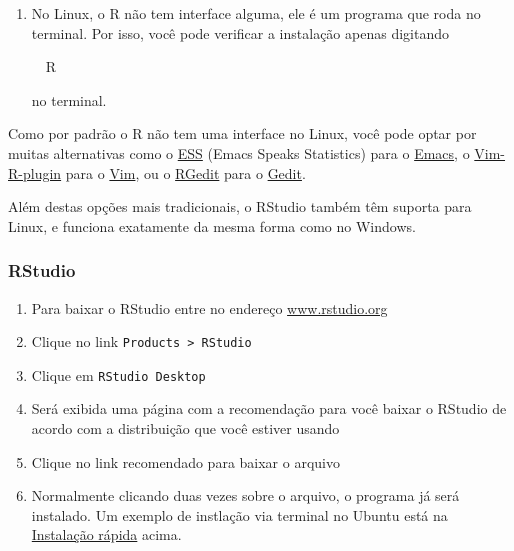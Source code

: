 \documentclass[a4paper,12pt]{article}\usepackage[]{graphicx}\usepackage[]{color}
\makeatletter
\newcommand{\hlopt}[1]{\textcolor[rgb]{0,0,0}{#1}}%
\newcommand{\hlstd}[1]{\textcolor[rgb]{0.345,0.345,0.345}{#1}}%
\newcommand{\hlkwb}[1]{\textcolor[rgb]{0.69,0.353,0.396}{#1}}%
\newenvironment{kframe}{%
 \def\at@end@of@kframe{}%
 \ifinner\ifhmode%
  \def\at@end@of@kframe{\end{minipage}}%
  \begin{minipage}{\columnwidth}%
 \fi\fi%
 \def\FrameCommand##1{\hskip\@totalleftmargin \hskip-\fboxsep
 \colorbox{shadecolor}{##1}\hskip-\fboxsep
     \hskip-\linewidth \hskip-\@totalleftmargin \hskip\columnwidth}%
 \MakeFramed {\advance\hsize-\width
   \@totalleftmargin\z@ \linewidth\hsize
   \@setminipage}}%
 {\par\unskip\endMakeFramed%
 \at@end@of@kframe}
\newenvironment{knitrout}{}{} %
\providecommand{\R}{\textsf{R}\xspace}
\providecommand{\RStudio}{\textsf{RStudio}\xspace}
\makeatother
\begin{document}
\begin{enumerate}
\begin{knitrout}
\begin{kframe}
\noindent
\ttfamily
\hlstd{}\hlstd{\ \ }\hlstd{.}\hlopt{/}\hlstd{configure\ }\hlopt{{-}{-}}\hlstd{}\hlkwb{enable}\hlstd{}\hlopt{{-}}\hlstd{R}\hlopt{{-}}\hlstd{shlib}\hspace*{\fill}
\mbox{}
\normalfont
\normalsize
\end{kframe}
\end{knitrout}
  e continue com os demais comandos.
\item No Linux, o \R não tem interface alguma, ele é um programa que
  roda no terminal. Por isso, você pode verificar a instalação apenas digitando
\begin{knitrout}\small
{}\color{fgcolor}\begin{kframe}
\noindent
\ttfamily
\hlstd{}\hlstd{\ \ }\hlstd{R}\hspace*{\fill}
\mbox{}
\normalfont
\normalsize
\end{kframe}
\end{knitrout}
  no terminal.
\end{enumerate}

Como por padrão o \R não tem uma interface no Linux, você pode optar por
muitas alternativas como o \href{http://ess.r-project.org}{ESS} (Emacs
Speaks Statistics) para o
\href{http://www.gnu.org/software/emacs/}{Emacs}, o
\href{http://www.lepem.ufc.br/jaa/r-plugin.html}{Vim-R-plugin} para o
\href{http://www.vim.org}{Vim}, ou o
\href{http://rgedit.sourceforge.net}{RGedit} para o
\href{http://projects.gnome.org/gedit}{Gedit}.

Além destas opções mais tradicionais, o \RStudio também têm suporta para
Linux, e funciona exatamente da mesma forma como no Windows.

\subsubsection{\RStudio}

\begin{enumerate}
\item Para baixar o \RStudio entre no endereço
  \url{www.rstudio.org}
\item Clique no link \texttt{Products > RStudio}
\item Clique em \texttt{RStudio Desktop}
\item Será exibida uma página com a recomendação para você baixar o
  \RStudio de acordo com a distribuição que você estiver usando
\item Clique no link recomendado para baixar o arquivo
\item Normalmente clicando duas vezes sobre o arquivo, o programa já
  será instalado. Um exemplo de instlação via terminal no Ubuntu está na
  \hyperref[sec:irl]{Instalação rápida} acima.
\end{enumerate}
\end{document}
